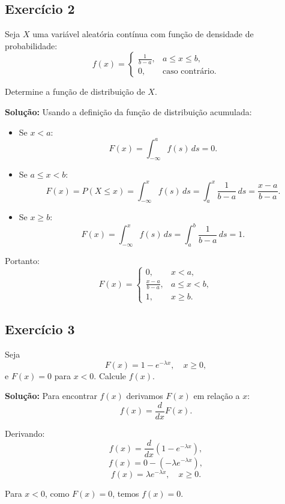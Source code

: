 \documentclass{article}
\begin{document}
\subsection{Exercício 2}
Seja $X$ uma variável aleatória contínua com função de densidade de probabilidade:
    $$
    f(x) =
    \begin{cases}
    \frac{1}{b-a}, & a \leq x \leq b, \\
    0, & \text{caso contrário}.
    \end{cases}
    $$

Determine a função de distribuição de $X$.

\vspace{0.5cm}
\textbf{Solução:} Usando a definição da função de distribuição acumulada:
\begin{itemize}
    \item Se $x < a$:
    $$
    F(x) = \int_{-\infty}^{a} f(s) \, ds = 0.
    $$
    \item Se $a \leq x < b$:
    $$
    F(x) = P(X \leq x) = \int_{-\infty}^{x} f(s) \, ds = \int_{a}^{x} \frac{1}{b-a} \, ds 
    = \frac{x-a}{b-a}.
    $$
    \item Se $x \geq b$:
    $$
    F(x) = \int_{-\infty}^{x} f(s) \, ds = \int_{a}^{b} \frac{1}{b-a} \, ds = 1.
    $$
\end{itemize}

Portanto:
    $$
    F(x) =
    \begin{cases}
    0, & x < a, \\
    \frac{x-a}{b-a}, & a \leq x < b, \\
    1, & x \geq b.
    \end{cases}
    $$

\subsection{Exercício 3}
Seja 
    $$
    F(x) = 1 - e^{-\lambda x}, \quad x \geq 0,
    $$
e $F(x) = 0$ para $x < 0$. Calcule $f(x)$.
    
\vspace{0.5cm}
\textbf{Solução:} Para encontrar $f(x)$ derivamos $F(x)$ em relação a $x$:
    $$
    f(x) = \frac{d}{dx} F(x).
    $$
    
Derivando:
    $$
    f(x) = \frac{d}{dx} \left( 1 - e^{-\lambda x} \right),
    $$
    $$
    f(x) = 0 - (-\lambda e^{-\lambda x}),
    $$
    $$
    f(x) = \lambda e^{-\lambda x}, \quad x \geq 0.
    $$
    
Para $x < 0$, como $F(x) = 0$, temos $f(x) = 0$.
\end{document}
